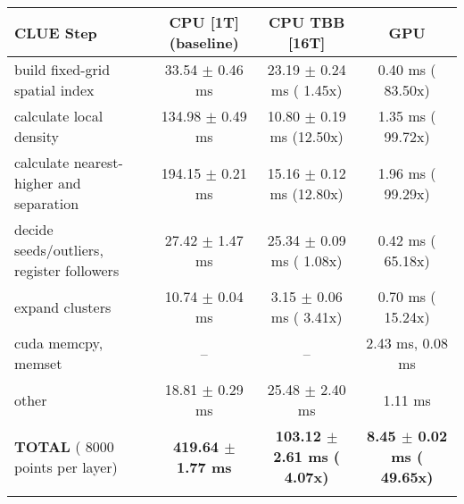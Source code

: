     \begin{tabular}{l|c|c|c}
    \hline
    CLUE Step                                 & CPU [1T] (baseline)         & CPU TBB [16T]                         & GPU                       \\ \hline
    build fixed-grid spatial index            &  33.54 $\pm$  0.46 ms       &  23.19 $\pm$  0.24 ms ( 1.45x)        &   0.40 ms ( 83.50x)       \\
    calculate local density                   & 134.98 $\pm$  0.49 ms       &  10.80 $\pm$  0.19 ms (12.50x)        &   1.35 ms ( 99.72x)       \\
    calculate nearest-higher and separation   & 194.15 $\pm$  0.21 ms       &  15.16 $\pm$  0.12 ms (12.80x)        &   1.96 ms ( 99.29x)       \\
    decide seeds/outliers, register followers &  27.42 $\pm$  1.47 ms       &  25.34 $\pm$  0.09 ms ( 1.08x)        &   0.42 ms ( 65.18x)       \\
    expand clusters                           &  10.74 $\pm$  0.04 ms       &   3.15 $\pm$  0.06 ms ( 3.41x)        &   0.70 ms ( 15.24x)       \\ \hline
    cuda memcpy, memset                       & --                          & --                                    &   2.43 ms,   0.08 ms      \\ 
    other                                     &  18.81 $\pm$  0.29 ms       &  25.48 $\pm$  2.40 ms                 &   1.11 ms                 \\ \hline
    \textbf{TOTAL} ( 8000 points per layer)   & \textbf{419.64 $\pm$  1.77 ms} & \textbf{103.12 $\pm$  2.61 ms ( 4.07x)} & \textbf{  8.45 $\pm$  0.02 ms ( 49.65x)}  \\
    \hline
    \multicolumn{4}{c}{} 
    \end{tabular}
    \linebreak


